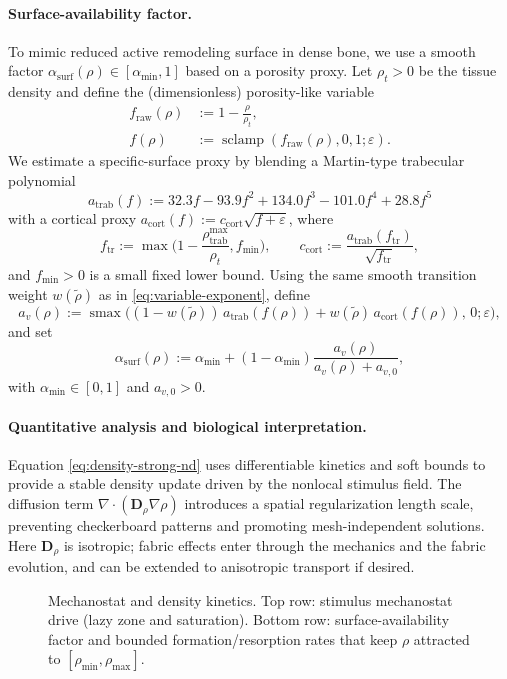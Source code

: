 \paragraph{Surface-availability factor.}
To mimic reduced active remodeling surface in dense bone, we use a smooth factor $\alpha_{\mathrm{surf}}(\rho)\in[\alpha_{\min},1]$ based on a porosity proxy. Let $\rho_t>0$ be the tissue density and define the (dimensionless) porosity-like variable
\begin{align*}
f_{\mathrm{raw}}(\rho) &:= 1-\frac{\rho}{\rho_t},\\
f(\rho) &:= \operatorname{sclamp}(f_{\mathrm{raw}}(\rho), 0, 1; \varepsilon).
\end{align*}
We estimate a specific-surface proxy by blending a Martin-type trabecular polynomial
\[
a_{\mathrm{trab}}(f):=32.3 f-93.9 f^2+134.0 f^3-101.0 f^4+28.8 f^5
\]
with a cortical proxy $a_{\mathrm{cort}}(f):=c_{\mathrm{cort}}\sqrt{f+\varepsilon}$, where
\[
f_{\mathrm{tr}}:=\max\!\Big(1-\frac{\rho_{\mathrm{trab}}^{\max}}{\rho_t},f_{\min}\Big),\qquad
c_{\mathrm{cort}}:=\frac{a_{\mathrm{trab}}(f_{\mathrm{tr}})}{\sqrt{f_{\mathrm{tr}}}},
\]
and $f_{\min}>0$ is a small fixed lower bound. Using the same smooth transition weight $w(\widetilde{\rho})$ as in \eqref{eq:variable-exponent}, define
\[
a_v(\rho):=\operatorname{smax}\!\Big((1-w(\widetilde{\rho}))\,a_{\mathrm{trab}}(f(\rho))+w(\widetilde{\rho})\,a_{\mathrm{cort}}(f(\rho)),\,0;\varepsilon\Big),
\]
and set
\begin{equation}\label{eq:Asurf-nd}
\alpha_{\mathrm{surf}}(\rho):=\alpha_{\min}+(1-\alpha_{\min})\frac{a_v(\rho)}{a_v(\rho)+a_{v,0}},
\end{equation}
with $\alpha_{\min}\in[0,1]$ and $a_{v,0}>0$.

\paragraph{Quantitative analysis and biological interpretation.}
Equation \eqref{eq:density-strong-nd} uses differentiable kinetics and soft bounds to provide a stable density update driven by the nonlocal stimulus field. The diffusion term $\nabla\!\cdot(\mathbf{D}_\rho\nabla\rho)$ introduces a spatial regularization length scale, preventing checkerboard patterns and promoting mesh-independent solutions. Here $\mathbf{D}_\rho$ is isotropic; fabric effects enter through the mechanics and the fabric evolution, and can be extended to anisotropic transport if desired.

\begin{figure}[htbp]
    \centering
    \caption{Mechanostat and density kinetics. Top row: stimulus mechanostat drive (lazy zone and saturation). Bottom row: surface-availability factor and bounded formation/resorption rates that keep $\rho$ attracted to $[\rho_{\min},\rho_{\max}]$.}
    \label{fig:mechanostat_law}
\end{figure}

